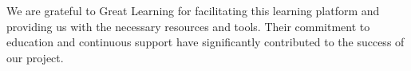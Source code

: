 \documentclass[11pt]{report}
\begin{document}
We are grateful to Great Learning for facilitating this learning platform and providing us with the necessary resources and tools. Their commitment to education and continuous support have significantly contributed to the success of our project.

\tableofcontents
\listoffigures
\listoftables

\newpage
\setcounter{page}{0}




\renewcommand\bibname{References}
\printbibliography


\end{document}
